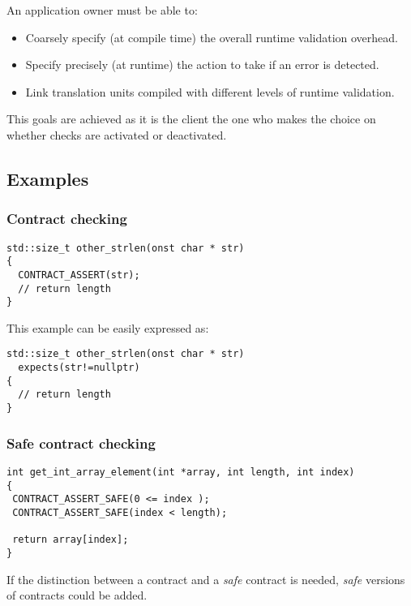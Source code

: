 An application owner must be able to:

\begin{itemize}

\item Coarsely specify (at compile time) the overall runtime validation
overhead.

\item Specify precisely (at runtime) the action to take if an error is detected. 

\item Link translation units compiled with different levels of runtime validation. 

\end{itemize}

This goals are achieved as it is the client the one who makes the choice on
whether checks are activated or deactivated.

\subsection{Examples}

\subsubsection{Contract checking}

\begin{lstlisting}
std::size_t other_strlen(onst char * str) 
{
  CONTRACT_ASSERT(str);
  // return length
}
\end{lstlisting}

This example can be easily expressed as:

\begin{lstlisting}
std::size_t other_strlen(onst char * str) 
  expects(str!=nullptr)
{
  // return length
}
\end{lstlisting}

\subsubsection{Safe contract checking}

\begin{lstlisting}
int get_int_array_element(int *array, int length, int index) 
{ 
 CONTRACT_ASSERT_SAFE(0 <= index ); 
 CONTRACT_ASSERT_SAFE(index < length); 

 return array[index]; 
} 
\end{lstlisting}

If the distinction between a contract and a \emph{safe} contract is needed,
\emph{safe} versions of contracts could be added.

